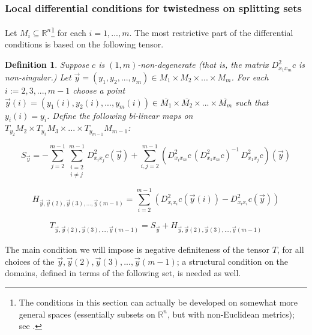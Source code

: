 \documentclass[letter,10pt]{article}
\theoremstyle{dotless}
\newcommand{\R}{\mathbb{R}}
\begin{document}
\subsubsection{Local differential conditions for twistedness  on splitting sets}
Let $M_i \subseteq \R^n$\footnote{The conditions in this section can actually be developed on somewhat more general spaces (essentially subsets on $\mathbb{R}^n$, but with non-Euclidean metrics); see \cite{P1}.} for each $i=1, ..., m$. The most restrictive part of the differential conditions is based on the following tensor.






\newtheorem{tensor}[mapping]{Definition}

\begin{tensor}
Suppose $c$ is $(1,m)$-non-degenerate (that is, the matrix $D^2_{x_1x_m}c $ is non-singular.) Let $\vec{y}=(y_1,y_2,...,y_m) \in M_1 \times M_2 \times...\times M_m$.  For each $i:=2,3,...,m-1$ choose a point $\vec{y}(i)=(y_1(i),y_2(i),...,y_m(i)) \in \overline{M_1} \times \overline{M_2} \times...\times \overline{M_m}$ such that $y_i(i)=y_i$.  Define the following bi-linear maps on $T_{y_2}M_2 \times T_{y_3}M_3 \times ...\times T_{y_{m-1}}M_{m-1}$:

\begin{equation*}
 S_{\vec{y}}=-\sum_{j=2}^{m-1} \sum_{\substack {i=2 \\ i \neq j}}^{m-1}D^2_{x_ix_j}c(\vec{y}) +\sum_{i,j=2}^{m-1}(D^2_{x_ix_m} c \, (D^{2}_{x_1x_m}c)^{-1}\, D^2_{x_1x_j}c)(\vec{y})
\end{equation*}

\begin{equation*}
 H_{\vec{y},\vec{y}(2),\vec{y}(3),...,\vec{y}(m-1)}=\sum_{i=2}^{m-1}( D^2_{x_i x_i} c(\vec{y} (i))- D^2_{x_ix_i}c(\vec{y}))
\end{equation*}


\begin{eqnarray*}
T_{\vec{y},\vec{y}(2),\vec{y}(3),...,\vec{y}(m-1)}=S_{\vec{y}}+H_{\vec{y},\vec{y}(2),\vec{y}(3),...,\vec{y}(m-1)}
\end{eqnarray*}
\end{tensor}
The main condition we will impose is negative definiteness of the tensor $T$, for all choices of the $\vec{y},\vec{y}(2),\vec{y}(3),...,\vec{y}(m-1)$; a structural condition on the domains, defined in terms of the following set, is needed as well.
\end{document}
